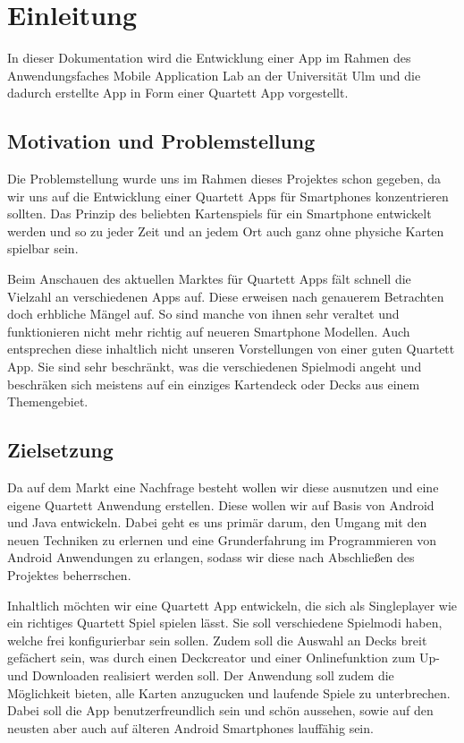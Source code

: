 \chapter{Einleitung}
\label{cha:einleitung}

In dieser Dokumentation wird die Entwicklung einer App im Rahmen des Anwendungsfaches Mobile Application Lab an der Universität Ulm und die dadurch erstellte App in Form einer Quartett App vorgestellt.

\section{Motivation und Problemstellung}
\label{sec:einleitung:problemstellung}

Die Problemstellung wurde uns im Rahmen dieses Projektes schon gegeben, da wir uns auf die Entwicklung einer Quartett Apps für Smartphones konzentrieren sollten. Das Prinzip des beliebten Kartenspiels für ein Smartphone entwickelt werden und so zu jeder Zeit und an jedem Ort auch ganz ohne physiche Karten spielbar sein.

Beim Anschauen des aktuellen Marktes für Quartett Apps fält schnell die Vielzahl an verschiedenen Apps auf. Diese erweisen nach genauerem Betrachten doch erhbliche Mängel auf. So sind manche von ihnen sehr veraltet und funktionieren nicht mehr richtig auf neueren Smartphone Modellen. Auch entsprechen diese inhaltlich nicht unseren Vorstellungen von einer guten Quartett App. Sie sind sehr beschränkt, was die verschiedenen Spielmodi angeht und beschräken sich meistens auf ein einziges Kartendeck oder Decks aus einem Themengebiet.

\section{Zielsetzung}
\label{sec:einleitung:zielsetzung}

Da auf dem Markt eine Nachfrage besteht wollen wir diese ausnutzen und eine eigene Quartett Anwendung erstellen. Diese wollen wir auf Basis von Android und Java entwickeln. Dabei geht es uns primär darum, den Umgang mit den neuen Techniken zu erlernen und eine Grunderfahrung im Programmieren von Android Anwendungen zu erlangen, sodass wir diese nach Abschließen des Projektes beherrschen.

Inhaltlich möchten wir eine Quartett App entwickeln, die sich als Singleplayer wie ein richtiges Quartett Spiel spielen lässt. Sie soll verschiedene Spielmodi haben, welche frei konfigurierbar sein sollen. Zudem soll die Auswahl an Decks breit gefächert sein, was durch einen Deckcreator und einer Onlinefunktion zum Up- und Downloaden realisiert werden soll. Der Anwendung soll zudem die Möglichkeit bieten, alle Karten anzugucken und laufende Spiele zu unterbrechen. Dabei soll die App benutzerfreundlich sein und schön aussehen, sowie auf den neusten aber auch auf älteren Android Smartphones lauffähig sein.

